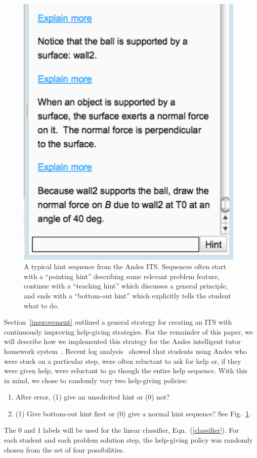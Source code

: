 \documentclass{edm_template}
\begin{document}
\begin{figure}
\centering    \includegraphics[scale=0.5]{andes-hint-sequence.png}
  \caption{A typical hint sequence from the Andes ITS. Sequences
    often start with a ``pointing hint'' describing some relevant problem
    feature, continue with a ``teaching hint'' which discusses a general principle,
    and ends with a ``bottom-out hint'' which explicitly tells the student
    what to do.}
         \label{hint-sequence}
\end{figure}

Section~\ref{improvement} outlined a general strategy for creating an
ITS with continuously improving help-giving strategies.  For the
remainder of this paper, we will describe how we implemented this
strategy for the Andes intelligent tutor homework system~\cite{vanlehn_andes_2005}.  
Recent log analysis~\cite{ranganathan_what_2013} showed that students 
using Andes
who were stuck on a particular step, were often reluctant to ask for
help or, if they were given help, were reluctant to go though the entire help
sequence.  With this in mind, we chose to randomly vary two
help-giving policies: 
%
\begin{enumerate} 
\item After error, (1) give an unsolicited hint or (0) not?
\item (1) Give bottom-out hint first or (0) give a normal hint sequence? See Fig.~\ref{hint-sequence}.
\end{enumerate}
%
The 0 and 1 labels will be used for the linear classifier, Eqn.~(\ref{classifier}).
For each student and each
problem solution step, the help-giving policy was randomly chosen from
the set of four possibilities.
\end{document}
